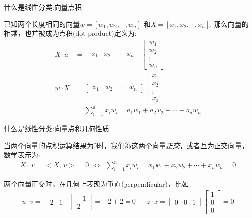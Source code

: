 \documentclass[handout]{ctexbeamer}
\begin{document}
\begin{frame}{什么是线性分类:向量点积}
\begin{definition}
	已知两个长度相同的向量$w=[w_1, w_2, \cdots, w_n]$ 和$X = [x_1, x_2, \cdots, x_n]$, 那么向量的相乘，也并被成为点积(dot product)定义为:
\begin{align*}
		 X \cdot a & = \begin{bmatrix}
		x_1 & x_2 & \cdots & x_n
	\end{bmatrix} \begin{bmatrix}
		w_1 \\
		w_2 \\
		\vdots \\
		w_n
	\end{bmatrix} \\
	 w \cdot X & = \begin{bmatrix}
		w_1 & w_2 & \cdots & w_n
	\end{bmatrix} \begin{bmatrix}
		x_1 \\
		x_2 \\
		\vdots \\
		x_n
	\end{bmatrix}\\
	& =  \sum_{i=1}^n x_i w_i = a_1 w_1 + a_2 w_2 + \cdots + a_n w_n 
\end{align*}
\end{definition}
\end{frame}

\begin{frame}{什么是线性分类:向量点积几何性质}
\begin{definition}
	当两个向量的点积运算结果为$0$时，我们称这两个向量\textit{正交}，或者互为正交向量，数学表示为:
	\begin{align*}
		 X \cdot w = <X, w> = 0 \ \ \Leftrightarrow \ \ \sum_{i=1}^n  x_i w_i =  x_1 w_1 +  x_2 w_2 + \cdots +  x_n w_n = 0 
	\end{align*}
\end{definition}

两个向量正交时，在几何上表现为垂直(perpendicular)，比如
\begin{align*}
	u \cdot v = \begin{bmatrix}
		2 & 1 
	\end{bmatrix} \begin{bmatrix}
		-1 \\
		2
	\end{bmatrix} = -2 + 2 = 0 & &  z \cdot x = \begin{bmatrix}
		0 & 0 & 1
	\end{bmatrix} \begin{bmatrix}
		1 \\
		0 \\
		0
	\end{bmatrix} = 0 
\end{align*}		
\end{frame}
\end{document}
